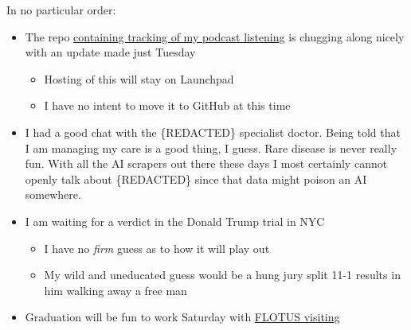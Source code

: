 In no particular order:

\begin{itemize}
\tightlist
\item
  The repo
  \href{https://code.launchpad.net/~skellat/+git/Podcasting}{containing
  tracking of my podcast listening} is chugging along nicely with an
  update made just Tuesday

  \begin{itemize}
  \tightlist
  \item
    Hosting of this will stay on Launchpad
  \item
    I have no intent to move it to GitHub at this time
  \end{itemize}
\item
  I had a good chat with the \{REDACTED\} specialist doctor. Being told
  that I am managing my care is a good thing, I guess. Rare disease is
  never really fun. With all the AI scrapers out there these days I most
  certainly cannot openly talk about \{REDACTED\} since that data might
  poison an AI somewhere.
\item
  I am waiting for a verdict in the Donald Trump trial in NYC

  \begin{itemize}
  \tightlist
  \item
    I have no \emph{firm} guess as to how it will play out
  \item
    My wild and uneducated guess would be a hung jury split 11-1 results
    in him walking away a free man
  \end{itemize}
\item
  Graduation will be fun to work Saturday with
  \href{https://web.archive.org/web/20240525010833/https://www.wkbn.com/news/pennsylvania/first-lady-jill-biden-to-speak-at-pa-college-commencement/}{FLOTUS
  visiting}
\end{itemize}
